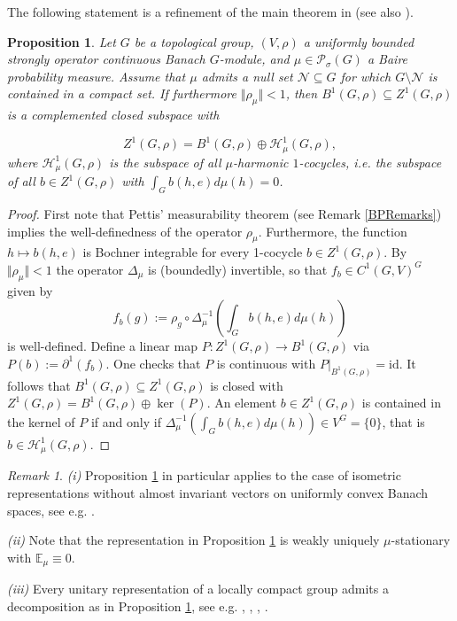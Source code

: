 \documentclass[a4paper,11pt,reqno]{amsart}
\numberwithin{equation}{section}
\newtheorem{proposition}[theorem]{Proposition}
\theoremstyle{definition}
\theoremstyle{remark}
\theoremstyle{remark}
\newtheorem{remark}[theorem]{Remark}
\begin{document}
The following statement is a refinement of the main theorem in \cite{Nowak17} (see also \cite[Example 6.1]{Rosendal22}).

\begin{proposition} \label{PiotrResult} Let $G$ be a topological group, $(V,\rho)$ a uniformly bounded strongly operator continuous Banach $G$-module, and $\mu\in\mathcal{P}_{\sigma}(G)$ a Baire probability measure. Assume that $\mu$ admits a null set $\mathcal{N}\subseteq G$ for which $G\setminus\mathcal{N}$ is contained in a compact set. If furthermore $\Vert\rho_{\mu}\Vert<1$, then $B^{1}(G,\rho)\subseteq Z^{1}(G,\rho)$ is a complemented closed subspace with

\[
Z^{1}(G,\rho)=B^{1}(G,\rho)\oplus\mathcal{H}_{\mu}^{1}(G,\rho),
\]
where $\mathcal{H}_{\mu}^{1}(G,\rho)$ is the subspace of all \emph{$\mu$-harmonic $1$-cocycles}, i.e. the subspace of all $b\in Z^{1}(G,\rho)$ with $\int_{G}b(h,e)d\mu(h)=0$. \end{proposition}

\begin{proof} First note that Pettis' measurability theorem (see Remark \ref{BPRemarks}) implies the well-definedness of the operator $\rho_{\mu}$. Furthermore, the function $h\mapsto b(h,e)$ is Bochner integrable for every 1-cocycle $b\in Z^{1}(G,\rho)$. By $\Vert\rho_{\mu}\Vert<1$ the operator $\Delta_{\mu}$ is (boundedly) invertible, so that $f_{b}\in C^{1}(G,V)^{G}$ given by 
\[
f_{b}(g):=\rho_{g}\circ\Delta_{\mu}^{-1}\left(\int_{G}b(h,e)d\mu(h)\right)
\]
is well-defined. Define a linear map $P:Z^{1}(G,\rho)\rightarrow B^{1}(G,\rho)$ via $P(b):=\partial^{1}(f_{b})$. One checks that $P$ is continuous with $P|_{B^{1}(G,\rho)}=\text{id}$. It follows that $B^{1}(G,\rho)\subseteq Z^{1}(G,\rho)$ is closed with $Z^{1}(G,\rho)=B^{1}(G,\rho)\oplus\ker(P)$. An element $b\in Z^{1}(G,\rho)$ is contained in the kernel of $P$ if and only if $\Delta_{\mu}^{-1}\left(\int_{G}b(h,e)d\mu(h)\right)\in V^{G}=\{0\}$, that is $b\in\mathcal{H}_{\mu}^{1}(G,\rho)$. \end{proof}

\begin{remark} \emph{(i)} Proposition \ref{PiotrResult} in particular applies to the case of isometric representations without almost invariant vectors on uniformly convex Banach spaces, see e.g. \cite[Lemma 5.2]{Rosendal22}.

\emph{(ii)} Note that the representation in Proposition \ref{PiotrResult} is weakly uniquely $\mu$-stationary with $\mathbb{E}_{\mu}\equiv0$.

\emph{(iii)} Every unitary representation of a locally compact group admits a decomposition as in Proposition \ref{PiotrResult}, see e.g. \cite{Guichardet72}, \cite{BekkaValette97}, \cite{Creutz11}, \cite{Creutz22}. \end{remark}
\end{document}
